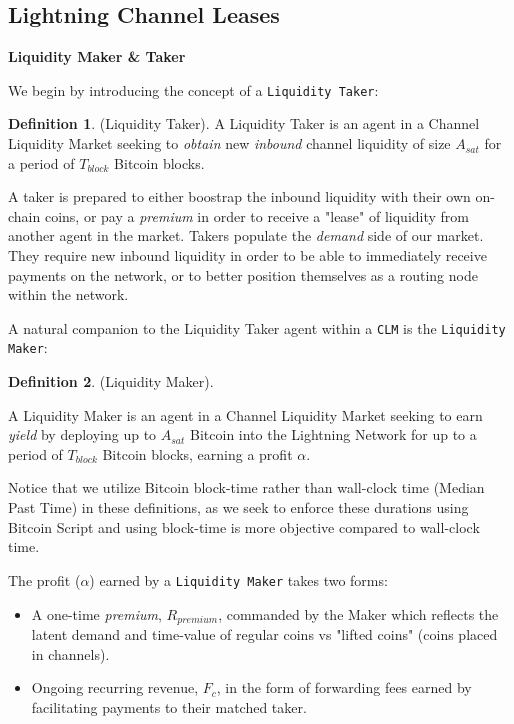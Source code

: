 \documentclass[10pt,a4paper]{article}
\theoremstyle{definition}
\newtheorem{definition}{Definition}[section]
\begin{document}
\subsection{Lightning Channel Leases}
\begin{center}
\textbf{Liquidity Maker \& Taker}
\end{center}

We begin by introducing the concept of a \texttt{Liquidity Taker}:

\theoremstyle{definition}

\begin{definition}{(Liquidity Taker).} %
    A Liquidity Taker is an agent in a Channel Liquidity Market seeking to
    \emph{obtain} new \emph{inbound} channel liquidity of size $A_{sat}$ for a
    period of $T_{block}$ Bitcoin blocks.
\end{definition}

A taker is prepared to either boostrap the inbound liquidity with their own
on-chain coins, or pay a \emph{premium} in order to receive a "lease" of
liquidity from another agent in the market. Takers populate the \emph{demand}
side of our market. They require new inbound liquidity in order to be able to
immediately receive payments on the network, or to better position themselves
as a routing node within the network.

A natural companion to the Liquidity Taker agent within a \texttt{CLM} is the
\texttt{Liquidity Maker}:

\theoremstyle{definition}
\begin{definition}{(Liquidity Maker).}

A Liquidity Maker is an agent in a Channel Liquidity Market seeking to earn
\emph{yield} by deploying up to $A_{sat}$ Bitcoin into the Lightning Network
for up to a period of $T_{block}$ Bitcoin blocks, earning a profit $\alpha$.

\end{definition}

Notice that we utilize Bitcoin block-time rather than wall-clock time (Median Past
Time) \cite{bip113} in these definitions, as we seek to enforce these durations using
Bitcoin Script and using block-time is more objective compared to wall-clock time.

The profit ($\alpha$) earned by a \texttt{Liquidity Maker} takes two forms:
\begin{itemize}
   \item A one-time \emph{premium}, $R_{premium}$, commanded by the Maker which
       reflects the latent demand and time-value of regular coins vs "lifted
       coins" (coins placed in channels).

   \item Ongoing recurring revenue, $F_c$,  in the form of forwarding fees
       earned by facilitating payments to their matched taker.
\end{itemize}
\end{document}
